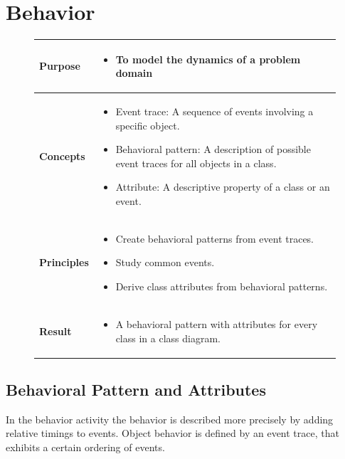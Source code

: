 \chapter{Behavior \ooad[91]}\label{chapter:behavior}
\begin{figure}[H]
    \begin{tabular}{|l|p{12cm}|}
        \hline
        \textbf{Purpose} & \begin{itemize}
            \item To model the dynamics of a problem domain
        \end{itemize} \\\hline
        \textbf{Concepts} & \begin{itemize}
            \item Event trace: A sequence of events involving a specific object.
            \item Behavioral pattern: A description of possible event traces for all objects in a class.
            \item Attribute: A descriptive property of a class or an event.
        \end{itemize} \\\hline
        \textbf{Principles} & \begin{itemize}
            \item Create behavioral patterns from event traces.
            \item Study common events.
            \item Derive class attributes from behavioral patterns.
        \end{itemize} \\\hline
        \textbf{Result} & \begin{itemize}
            \item A behavioral pattern with attributes for every class in a class diagram.
        \end{itemize} \\\hline
    \end{tabular}
\end{figure}

\section{Behavioral Pattern and Attributes}
In the behavior activity the behavior is described more precisely by adding relative timings to events. Object behavior is defined by an event trace, that exhibits a certain ordering of events.

